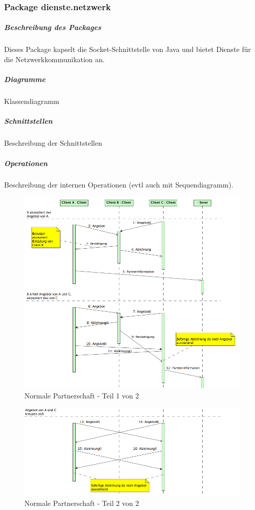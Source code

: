 \documentclass[a4paper,12pt,halfparskip,DIV12]{scrartcl}
\begin{document}
\clearpage
\subsubsection{Package dienste.netzwerk} %
\label{ssub:package_dienste_netzwerk}
\subparagraph{Beschreibung des Packages} %
\label{ssub:beschreibung_des_packages}
Dieses Package kapselt die Socket-Schnittstelle von Java und bietet Dienste für die Netzwerkkommunikation an.
\subparagraph{Diagramme} %
\label{ssub:diagramme}
Klassendiagramm
\subparagraph{Schnittstellen} %
\label{ssub:schnittstellen}
Beschreibung der Schnittstellen
\subparagraph{Operationen} %
\label{ssub:operationen}
Beschreibung der internen Operationen (evtl auch mit Sequendiagramm).
\begin{figure}[h]
	\centering
	\includegraphics[width=\textwidth]{dienste_partnerschaft_normal_1}
	\caption{Normale Partnerschaft - Teil 1 von 2}
	\label{fig:dienste_partnerschaft_normal_1}
\end{figure}
\begin{figure}
	\centering
	\includegraphics[width=\textwidth]{dienste_partnerschaft_normal_2}
	\caption{Normale Partnerschaft - Teil 2 von 2}
	\label{fig:dienste_partnerschaft_normal_2}
\end{figure}
\end{document}
